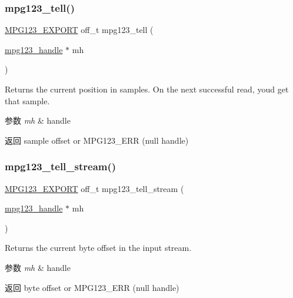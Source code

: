 \subsubsection{\texorpdfstring{mpg123\+\_\+tell()}{mpg123\_tell()}}
{\footnotesize\ttfamily \hyperlink{mpg123_8h_a2ba98cfba3f760879df70e755b2a61cc}{M\+P\+G123\+\_\+\+E\+X\+P\+O\+RT} off\+\_\+t mpg123\+\_\+tell (\begin{DoxyParamCaption}\item[{\hyperlink{group__mpg123__init_ga6728e2839a395f3a07d4514da659faca}{mpg123\+\_\+handle} $\ast$}]{mh }\end{DoxyParamCaption})}

Returns the current position in samples. On the next successful read, you\textquotesingle{}d get that sample. 
\begin{DoxyParams}{参数}
{\em mh} & handle \\
\hline
\end{DoxyParams}
\begin{DoxyReturn}{返回}
sample offset or M\+P\+G123\+\_\+\+E\+RR (null handle) 
\end{DoxyReturn}
\mbox{\label{group__mpg123__seek_ga385bcc9fd3cec22289410828eac3938b}} 
\subsubsection{\texorpdfstring{mpg123\+\_\+tell\+\_\+stream()}{mpg123\_tell\_stream()}}
{\footnotesize\ttfamily \hyperlink{mpg123_8h_a2ba98cfba3f760879df70e755b2a61cc}{M\+P\+G123\+\_\+\+E\+X\+P\+O\+RT} off\+\_\+t mpg123\+\_\+tell\+\_\+stream (\begin{DoxyParamCaption}\item[{\hyperlink{group__mpg123__init_ga6728e2839a395f3a07d4514da659faca}{mpg123\+\_\+handle} $\ast$}]{mh }\end{DoxyParamCaption})}

Returns the current byte offset in the input stream. 
\begin{DoxyParams}{参数}
{\em mh} & handle \\
\hline
\end{DoxyParams}
\begin{DoxyReturn}{返回}
byte offset or M\+P\+G123\+\_\+\+E\+RR (null handle) 
\end{DoxyReturn}
\mbox{\label{group__mpg123__seek_gaab81ee3527294d01e2c10a10e91022ee}} 
